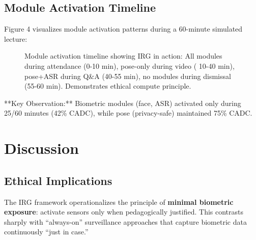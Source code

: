 \documentclass[conference]{IEEEtran}
\begin{document}
\subsection{Module Activation Timeline}
Figure 4 visualizes module activation patterns during a 60-minute simulated lecture:

\begin{figure}[htbp]
\centering
{}

\caption{Module activation timeline showing IRG in action: All modules during attendance (0-10 min), pose-only during video ( 10-40 min), pose+ASR during Q\&A (40-55 min), no modules during dismissal (55-60 min). Demonstrates ethical compute principle.}
\label{fig:timeline}
\end{figure}

**Key Observation:** Biometric modules (face, ASR) activated only during 25/60 minutes (42\% CADC), while pose (privacy-safe) maintained 75\% CADC.

\section{Discussion}

\subsection{Ethical Implications}
The IRG framework operationalizes the principle of \textbf{minimal biometric exposure}: activate sensors only when pedagogically justified. This contrasts sharply with ``always-on'' surveillance approaches that capture biometric data continuously ``just in case.''
\end{document}
